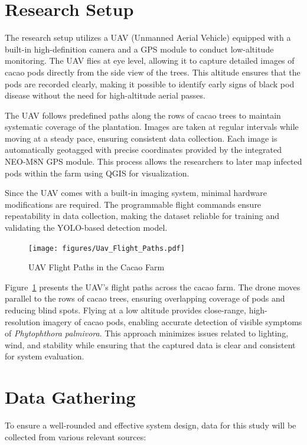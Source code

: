 \section{Research Setup}

The research setup utilizes a UAV (Unmanned Aerial Vehicle) equipped with a built-in high-definition camera and a GPS module to conduct low-altitude monitoring. The UAV flies at eye level, allowing it to capture detailed images of cacao pods directly from the side view of the trees.
This altitude ensures that the pods are recorded clearly, making it possible to identify early signs of black pod disease without the need for high-altitude aerial passes.

The UAV follows predefined paths along the rows of cacao trees to maintain systematic coverage of the plantation. 
Images are taken at regular intervals while moving at a steady pace, ensuring consistent data collection. 
Each image is automatically geotagged with precise coordinates provided by the integrated NEO-M8N GPS module. 
This process allows the researchers to later map infected pods within the farm using QGIS for visualization.

Since the UAV comes with a built-in imaging system, minimal hardware modifications are required. 
The programmable flight commands ensure repeatability in data collection, making the dataset reliable for training and validating the YOLO-based detection model.

\begin{figure}[H]
	\centering
	\caption{UAV Flight Paths in the Cacao Farm}
	\label{fig:uav_flight_paths}
	\texttt{[image: figures/Uav\_Flight\_Paths.pdf]}
\end{figure}

Figure~\ref{fig:uav_flight_paths} presents the UAV’s flight paths across the cacao farm. 
The drone moves parallel to the rows of cacao trees, ensuring overlapping coverage of pods and reducing blind spots. 
Flying at a low altitude provides close-range, high-resolution imagery of cacao pods, enabling accurate detection of visible symptoms of \textit{Phytophthora palmivora}. 
This approach minimizes issues related to lighting, wind, and stability while ensuring that the captured data is clear and consistent for system evaluation.



\section{Data Gathering}
To ensure a well-rounded and effective system design, data for this study will be collected from various relevant sources:

